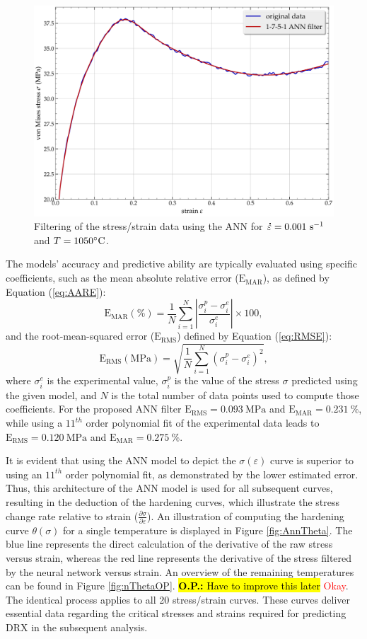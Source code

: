 \documentclass[metals,article,submit,pdftex,moreauthors]{Definitions/mdpi}
\DeclareRobustCommand{\mdot}[1]{\accentset{\mbox{\bfseries .}}{#1}}
\DeclareRobustCommand{\RMSE}{\text{E}_\text{RMS}}
\DeclareRobustCommand{\MARE}{\text{E}_\text{MAR}}
\DeclareRobustCommand{\ps}{\text{s}^{-1}}
\DeclareRobustCommand{\MPa}{\text{MPa}}
\DeclareRobustCommand{\OP}[1]{\begingroup\sethlcolor{VWyellow}\textcolor{red}{\hl{\textbf{O.P.:} #1}}\endgroup}
\begin{document}
\begin{figure}[H]
\centering
\includegraphics[width=0.7\columnwidth]{Figures/AnnFit}
\caption{Filtering of the stress/strain data using the ANN for $\mdot\varepsilon=0.001~\ps$ and $T=1050\celsius$.}
\label{fig:AnnFit}
\end{figure}
The models' accuracy and predictive ability are typically evaluated using specific coefficients, such as the mean absolute relative error ($\MARE$), as defined by Equation (\ref{eq:AARE}):
\begin{equation}
\MARE(\%) = \frac{1}{N} \sum_{i=1}^{N}{\left|\frac{\sigma_i^p -\sigma_i^e}{\sigma_i^e}\right|} \times 100, \label{eq:AARE}
\end{equation}
and the root-mean-squared error ($\RMSE$) defined by Equation (\ref{eq:RMSE}):
\begin{equation}
\RMSE (\MPa) = \sqrt{\frac{1}{N} \sum_{i=1}^{N} \left(\sigma_i^p - \sigma_i^e\right)^2}, \label{eq:RMSE}
\end{equation}
where $\sigma_i^e$ is the experimental value, $\sigma_i^p$ is the value of the stress $\sigma$ predicted using the given model, and $N$ is the total number of data points used to compute those coefficients.
For the proposed ANN filter $\RMSE=0.093~\MPa$ and $\MARE=0.231~\%$, while using a $11^{th}$ order polynomial fit of the experimental data leads to $\RMSE=0.120~\MPa$ and $\MARE=0.275~\%$.

It is evident that using the ANN model to depict the $\sigma(\varepsilon)$ curve is superior to using an $11^{th}$ order polynomial fit, as demonstrated by the lower estimated error.
Thus, this architecture of the ANN model is used for all subsequent curves, resulting in the deduction of the hardening curves, which illustrate the stress change rate relative to strain ($\frac{\partial \sigma}{\partial \varepsilon}$).
An illustration of computing the hardening curve $\theta(\sigma)$ for a single temperature is displayed in Figure \ref{fig:AnnTheta}. The blue line represents the direct calculation of the derivative of the raw stress versus strain, whereas the red line represents the derivative of the stress filtered by the neural network versus strain.
An overview of the remaining temperatures can be found in Figure \ref{fig:nThetaOP}. \OP{Have to improve this later} \textcolor{red}{Okay}.
The identical process applies to all 20 stress/strain curves.
These curves deliver essential data regarding the critical stresses and strains required for predicting DRX in the subsequent analysis.
\end{document}
